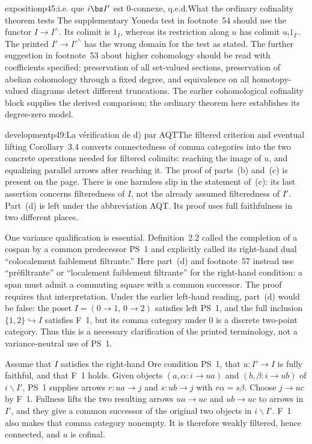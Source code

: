\begin{dcomment}{exposition}{p45:i.e. que $i\bs I'$ est 0-connexe, q.e.d.}{What the ordinary cofinality theorem tests}
The supplementary Yoneda test in footnote~54 should use the functor $I\longrightarrow I^{\wedge}$. Its colimit is $1_I$, whereas its restriction along $u$ has colimit $u_!1_{I'}$. The printed $I'\longrightarrow I'^{\wedge}$ has the wrong domain for the test as stated. The further suggestion in footnote~53 about higher cohomology should be read with coefficients specified: preservation of all set-valued sections, preservation of abelian cohomology through a fixed degree, and equivalence on all homotopy-valued diagrams detect different truncations. The earlier cohomological cofinality block supplies the derived comparison; the ordinary theorem here establishes its degree-zero model.
\end{dcomment}

\begin{dcomment}{development}{p49:La vérification de d) par AQT}{The filtered criterion and eventual lifting}
Corollary~3.4 converts connectedness of comma categories into the two concrete operations needed for filtered colimits: reaching the image of $u$, and equalizing parallel arrows after reaching it. The proof of parts~(b) and~(c) is present on the page. There is one harmless slip in the statement of~(c): its last assertion concerns filteredness of $I$, not the already assumed filteredness of $I'$. Part~(d) is left under the abbreviation AQT. Its proof uses full faithfulness in two different places.

One variance qualification is essential. Definition~2.2 called the completion of a cospan by a common predecessor PS~1 and explicitly called its right-hand dual ``colocalement faiblement filtrante.'' Here part~(d) and footnote~57 instead use ``pr\'efiltrante'' or ``localement faiblement filtrante'' for the right-hand condition: a span must admit a commuting square with a common successor. The proof requires that interpretation. Under the earlier left-hand reading, part~(d) would be false: the poset $I=(0\longrightarrow1,\,0\longrightarrow2)$ satisfies left PS~1, and the full inclusion $\{1,2\}\hookrightarrow I$ satisfies F~1, but its comma category under $0$ is a discrete two-point category. Thus this is a necessary clarification of the printed terminology, not a variance-neutral use of PS~1.

Assume that $I$ satisfies the right-hand Ore condition PS~1, that $u:I'\longrightarrow I$ is fully faithful, and that F~1 holds. Given objects $(a,\alpha:i\longrightarrow u a)$ and $(b,\beta:i\longrightarrow u b)$ of $i\backslash I'$, PS~1 supplies arrows $r:u a\longrightarrow j$ and $s:u b\longrightarrow j$ with $r\alpha=s\beta$. Choose $j\longrightarrow u c$ by F~1. Fullness lifts the two resulting arrows $u a\longrightarrow u c$ and $u b\longrightarrow u c$ to arrows in $I'$, and they give a common successor of the original two objects in $i\backslash I'$. F~1 also makes that comma category nonempty. It is therefore weakly filtered, hence connected, and $u$ is cofinal.


\end{dcomment}
